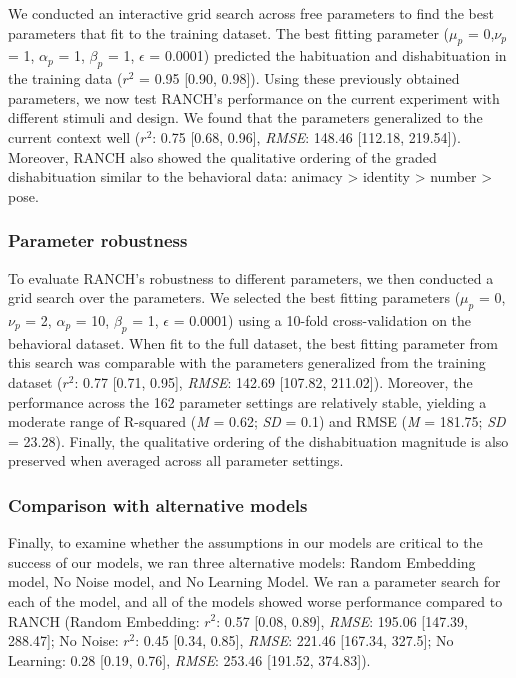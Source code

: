 \documentclass[10pt, letterpaper]{article}
\begin{document}
We conducted an interactive grid search across free parameters to find
the best parameters that fit to the training dataset. The best fitting
parameter (\(\mu_{p}\) = 0,\(\nu_{p}\) = 1, \(\alpha_{p}\) = 1,
\(\beta_{p}\) = 1, \(\epsilon\) = 0.0001) predicted the habituation and
dishabituation in the training data (\(r^2\) = 0.95 {[}0.90, 0.98{]}).
Using these previously obtained parameters, we now test RANCH's
performance on the current experiment with different stimuli and design.
We found that the parameters generalized to the current context well
(\(r^2\): 0.75 {[}0.68, 0.96{]}, \emph{RMSE}: 148.46 {[}112.18,
219.54{]}). Moreover, RANCH also showed the qualitative ordering of the
graded dishabituation similar to the behavioral data: animacy
\textgreater{} identity \textgreater{} number \textgreater{} pose.

\hypertarget{parameter-robustness}{%
\subsubsection{Parameter robustness}\label{parameter-robustness}}

To evaluate RANCH's robustness to different parameters, we then
conducted a grid search over the parameters. We selected the best
fitting parameters (\(\mu_{p}\) = 0,\(\nu_{p}\) = 2, \(\alpha_{p}\) =
10, \(\beta_{p}\) = 1, \(\epsilon\) = 0.0001) using a 10-fold
cross-validation on the behavioral dataset. When fit to the full
dataset, the best fitting parameter from this search was comparable with
the parameters generalized from the training dataset (\(r^2\): 0.77
{[}0.71, 0.95{]}, \emph{RMSE}: 142.69 {[}107.82, 211.02{]}). Moreover,
the performance across the 162 parameter settings are relatively stable,
yielding a moderate range of R-squared (\emph{M} = 0.62; \emph{SD} =
0.1) and RMSE (\emph{M} = 181.75; \emph{SD} = 23.28). Finally, the
qualitative ordering of the dishabituation magnitude is also preserved
when averaged across all parameter settings.

\hypertarget{comparison-with-alternative-models}{%
\subsubsection{Comparison with alternative
models}\label{comparison-with-alternative-models}}

Finally, to examine whether the assumptions in our models are critical
to the success of our models, we ran three alternative models: Random
Embedding model, No Noise model, and No Learning Model. We ran a
parameter search for each of the model, and all of the models showed
worse performance compared to RANCH (Random Embedding: \(r^2\): 0.57
{[}0.08, 0.89{]}, \emph{RMSE}: 195.06 {[}147.39, 288.47{]}; No Noise:
\(r^2\): 0.45 {[}0.34, 0.85{]}, \emph{RMSE}: 221.46 {[}167.34, 327.5{]};
No Learning: 0.28 {[}0.19, 0.76{]}, \emph{RMSE}: 253.46 {[}191.52,
374.83{]}).
\end{document}
